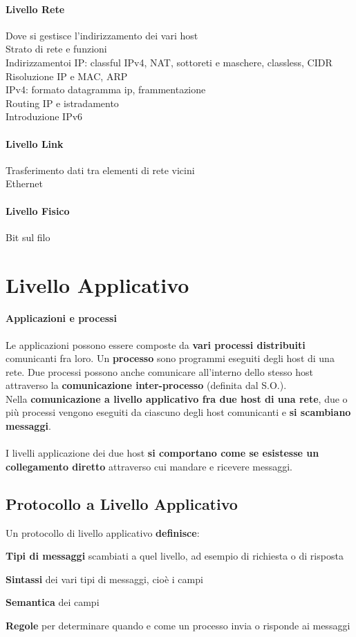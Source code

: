 \documentclass[10pt]{article}
\begin{document}
\begin{multicols}{2}
\paragraph{Livello Rete} Dove si gestisce l'indirizzamento dei vari host\\
Strato di rete e funzioni\\
Indirizzamentoi IP: classful IPv4, NAT, sottoreti e maschere, classless, CIDR\\
Risoluzione IP e MAC, ARP\\
IPv4: formato datagramma ip, frammentazione\\
Routing IP e istradamento\\
Introduzione IPv6
\paragraph{Livello Link} Trasferimento dati tra elementi di rete vicini\\
Ethernet
\paragraph{Livello Fisico} Bit sul filo
\end{multicols}
\pagebreak
\section{Livello Applicativo}
\paragraph{Applicazioni e processi} Le applicazioni possono essere composte da \textbf{vari processi distribuiti} comunicanti fra loro. Un \textbf{processo} sono programmi eseguiti degli host di una rete. Due processi possono anche comunicare all'interno dello stesso host attraverso la \textbf{comunicazione inter-processo} (definita dal S.O.).\\
Nella \textbf{comunicazione a livello applicativo fra due host di una rete}, due o più processi vengono eseguiti da ciascuno degli host comunicanti e \textbf{si scambiano messaggi}.\\\\
I livelli applicazione dei due host \textbf{si comportano come se esistesse un collegamento diretto} attraverso cui mandare e ricevere messaggi.
\subsection{Protocollo a Livello Applicativo}
Un protocollo di livello applicativo \textbf{definisce}:
\begin{list}{}{}
\item \textbf{Tipi di messaggi} scambiati a quel livello, ad esempio di richiesta o di risposta
\item \textbf{Sintassi} dei vari tipi di messaggi, cioè i campi
\item \textbf{Semantica} dei campi
\item \textbf{Regole} per determinare quando e come un processo invia o risponde ai messaggi
\end{list}
\end{document}
